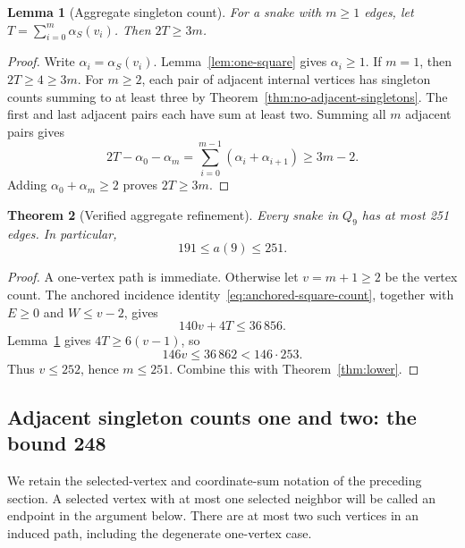 \documentclass[11pt,a4paper]{article}
\newtheorem{theorem}{Theorem}[section]
\newtheorem{lemma}[theorem]{Lemma}
\theoremstyle{definition}
\theoremstyle{remark}
\newcommand{\Q}{Q}
\begin{document}
\begin{lemma}[Aggregate singleton count]\label{lem:aggregate-singleton}
For a snake with $m\ge1$ edges, let $T=\sum_{i=0}^{m}\alpha_S(v_i)$. Then $2T\ge3m$.
\end{lemma}
\begin{proof}
Write $\alpha_i=\alpha_S(v_i)$. Lemma~\ref{lem:one-square} gives $\alpha_i\ge1$. If $m=1$, then $2T\ge4\ge3m$. For $m\ge2$, each pair of adjacent internal vertices has singleton counts summing to at least three by Theorem~\ref{thm:no-adjacent-singletons}. The first and last adjacent pairs each have sum at least two. Summing all $m$ adjacent pairs gives
\[
2T-\alpha_0-\alpha_m
=\sum_{i=0}^{m-1}(\alpha_i+\alpha_{i+1})
\ge 3m-2.
\]
Adding $\alpha_0+\alpha_m\ge2$ proves $2T\ge3m$.
\end{proof}

\begin{theorem}[Verified aggregate refinement]\label{thm:upper251}
Every snake in $\Q_9$ has at most 251 edges. In particular,
\[
\boxed{191\le a(9)\le251.}
\]
\end{theorem}
\begin{proof}
A one-vertex path is immediate. Otherwise let $v=m+1\ge2$ be the vertex count. The anchored incidence identity~\eqref{eq:anchored-square-count}, together with $E\ge0$ and $W\le v-2$, gives
\[
140v+4T\le36\,856.
\]
Lemma~\ref{lem:aggregate-singleton} gives $4T\ge6(v-1)$, so
\[
146v\le36\,862<146\cdot253.
\]
Thus $v\le252$, hence $m\le251$. Combine this with Theorem~\ref{thm:lower}.
\end{proof}


\subsection{Adjacent singleton counts one and two: the bound 248}
We retain the selected-vertex and coordinate-sum notation of the preceding section. A selected vertex with at most one selected neighbor will be called an endpoint in the argument below. There are at most two such vertices in an induced path, including the degenerate one-vertex case.
\end{document}
